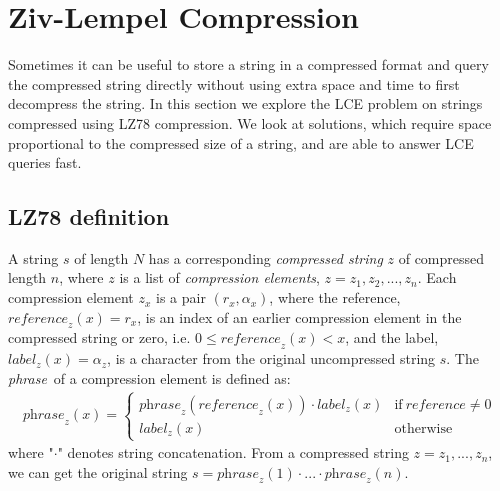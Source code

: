 \documentclass[a4]{article}
\begin{document}
\section{Ziv-Lempel Compression\label{sec:lz-compress}}

\newcommand{\zreference}{\textit{reference}}
\newcommand{\zlabel}{\textit{label}}
\newcommand{\zphrase}{\textit{phrase}}

Sometimes it can be useful to store a string in a compressed format and query the compressed string directly without using extra space and time to first decompress the string. In this section we explore the LCE problem on strings compressed using LZ78 compression. We look at solutions, which require space proportional to the compressed size of a string, and are able to answer LCE queries fast.

\subsection{LZ78 definition\label{sec:lz-definition}}
A string $s$ of length $N$ has a corresponding \textit{compressed string} $z$ of compressed length $n$, where $z$ is a list of \textit{compression elements}, $z = z_1, z_2, ..., z_n$. Each compression element $z_x$ is a pair $(r_x, \alpha_x)$, where the reference, $\zreference_z(x)=r_x$, is an index of an earlier compression element in the compressed string or zero, i.e. $0 \leq \zreference_z(x) < x$, and the label, $\zlabel_z(x)=\alpha_z$, is a character from the original uncompressed string $s$. The \zphrase\ of a compression element is defined as:
\begin{align*}
\zphrase_z(x) =
\begin{cases}
    \zphrase_z(\zreference_z(x)) \cdot \zlabel_z(x) & \textrm{if}~ \zreference \neq 0\\
    \zlabel_z(x) & \textrm{otherwise}
\end{cases}
\end{align*}
where "$\cdot$" denotes string concatenation. From a compressed string $z = z_1,...,z_n$, we can get the original string $s=\zphrase_z(1)\cdot...\cdot\zphrase_z(n)$.
\end{document}
